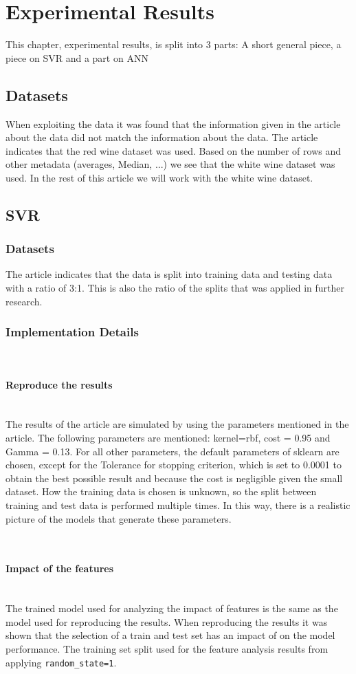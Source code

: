 \documentclass{article}
\newcommand{\subsubsubsection}[1]{%
  \paragraph{#1}\mbox{}\\}
\begin{document}
\section{Experimental Results}
This chapter, experimental results, is split into 3 parts: A short general piece, a piece on SVR and a part on ANN

\subsection{Datasets}
When exploiting the data it was found that the information given in the article about the data did not match the information about the data. The article indicates that the red wine dataset was used. Based on the number of rows and other metadata (averages, Median, ...) we see that the white wine dataset was used. In the rest of this article we will work with the white wine dataset.

\subsection{SVR}

\subsubsection{Datasets}
The article indicates that the data is split into training data and testing data with a ratio of 3:1. This is also the ratio of the splits that was applied in further research.

\subsubsection{Implementation Details}

\subsubsubsection{Reproduce the results}
The results of the article are simulated by using the parameters mentioned in the article. The following parameters are mentioned: kernel=rbf, cost = 0.95 and Gamma = 0.13. For all other parameters, the default parameters of sklearn are chosen, except for the Tolerance for stopping criterion, which is set to 0.0001 to obtain the best possible result and because the cost is negligible given the small dataset.
How the training data is chosen is unknown, so the split between training and test data is performed multiple times. In this way, there is a realistic picture of the models that generate these parameters.

\subsubsubsection{Impact of the features}
The trained model used for analyzing the impact of features is the same as the model used for reproducing the results.
When reproducing the results it was shown that the selection of a train and test set has an impact of on the model performance.
The training set split used for the feature analysis results from applying {\texttt{random\_state=1}}.
\end{document}
